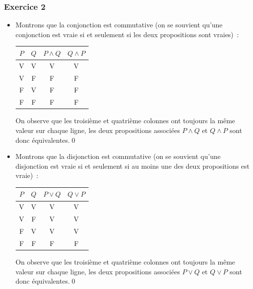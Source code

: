 \documentclass[10pt,notheorems]{beamer}
\theoremstyle{plain}
\theoremstyle{definition} %
\begin{document}
\begin{frame}
  \frametitle{Exercice 2}
  \fontsize{8}{10}\selectfont

  \begin{itemize}

  \item Montrons que la conjonction est commutative (on se souvient qu'une conjonction est vraie si et seulement si les deux propositions sont vraies)~:
    \begin{table}[H]
      \centering
      \begin{tabular}[H]{|cc|cc|}
        \hline
        $P$ & $Q$ & $P \land Q$ & $Q \land P$\\ \hline
        V & V & V & V\\
        V & F & F & F\\
        F & V & F & F\\
        F & F & F & F \\
        \hline\hline
      \end{tabular}
    \end{table}
    On observe que les troisième et quatrième colonnes ont toujours
    la même valeur sur chaque ligne, les deux propositions associées
    $P \land Q$ et $Q \land P$ sont donc équivalentes.\qed\newline

    \item Montrons que la disjonction est commutative (on se souvient qu'une disjonction est vraie si et seulement si au moins une des deux propositions est vraie)~:
    \begin{table}[H]
      \centering
      \begin{tabular}[H]{|cc|cc|}
        \hline
        $P$ & $Q$ & $P \lor Q$ & $Q \lor P$\\ \hline
        V & V & V & V\\
        V & F & V & V\\
        F & V & V & V\\
        F & F & F & F \\
        \hline\hline
      \end{tabular}
    \end{table}
    On observe que les troisième et quatrième colonnes ont toujours
    la même valeur sur chaque ligne, les deux propositions associées
    $P \lor Q$ et $Q \lor P$ sont donc équivalentes.\qed\newline

  \end{itemize}

\end{frame}
\end{document}
